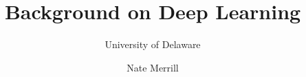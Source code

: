 \documentclass{beamer}
\institute{\texttt{[image: ud\_logo]}}
\title{\bf{Background on Deep Learning}}
\author{Nate Merrill}
\subtitle{University of Delaware}
\begin{document}
 
\frame{\titlepage}


\begin{frame}{}
    	\begin{columns}
	\end{columns}	
\end{frame}
\end{document}
